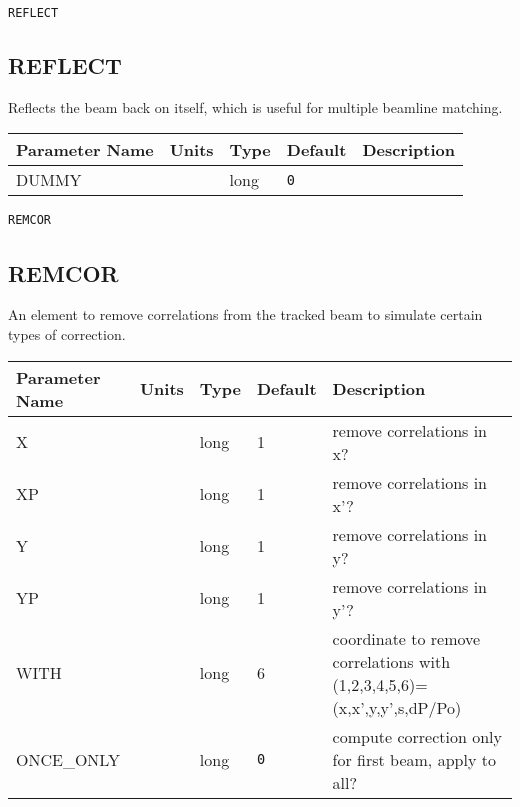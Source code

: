 \begin{latexonly}
\newpage
\begin{center}{\Large\verb|REFLECT|}\end{center}
\end{latexonly}\subsection{REFLECT}
Reflects the beam back on itself, which is useful for multiple beamline matching.
\\
\begin{tabular}{|l|l|l|l|p{\descwidth}|} \hline
Parameter Name & Units & Type & Default & Description \\ \hline 
DUMMY &  & long &  \verb|0| & \\ \hline 
\end{tabular}

\begin{latexonly}
\newpage
\begin{center}{\Large\verb|REMCOR|}\end{center}
\end{latexonly}\subsection{REMCOR}
An element to remove correlations from the tracked beam to simulate certain types of correction.
\\
\begin{tabular}{|l|l|l|l|p{\descwidth}|} \hline
Parameter Name & Units & Type & Default & Description \\ \hline 
X &  & long &   1               & remove correlations in x?  \\ \hline 
XP &  & long &   1               & remove correlations in x'?  \\ \hline 
Y &  & long &   1               & remove correlations in y?  \\ \hline 
YP &  & long &   1               & remove correlations in y'?  \\ \hline 
WITH &  & long &   6               & coordinate to remove correlations with (1,2,3,4,5,6)=(x,x',y,y',s,dP/Po)  \\ \hline 
ONCE\_ONLY &  & long &  \verb|0| & compute correction only for first beam, apply to all?  \\ \hline 
\end{tabular}

